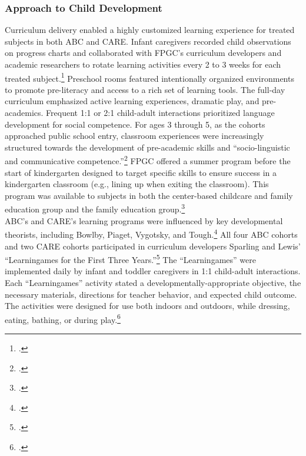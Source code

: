 \begin{appendices}
\subsubsection{Approach to Child Development}
\noindent Curriculum delivery enabled a highly customized learning experience for treated subjects in both ABC and CARE. Infant caregivers recorded child observations on progress charts and collaborated with FPGC's curriculum developers and academic researchers to rotate learning activities every 2 to 3 weeks for each treated subject.\footnote{\citet{Ramey_Collier_etal_1976_CarolinaAbecedarianProject,Campbell_Ramey_1994_CD}.} Preschool rooms featured intentionally organized environments to promote pre-literacy and access to a rich set of learning tools. The full-day curriculum emphasized active learning experiences, dramatic play, and pre-academics. Frequent 1:1 or 2:1 child-adult interactions prioritized language development for social competence. For ages 3 through 5, as the cohorts approached public school entry, classroom experiences were increasingly structured  towards the development of pre-academic skills and ``socio-linguistic and communicative competence.''\footnote{\citet{Ramey-et-al_1977_Intro-to-ABC, Haskins_1985_CD, Ramey_1981_Modification, Ramey_Campbell_1979_SR, Ramey_Smith_1977_AJMD, Ramey_McGinness_etal_1982_Abecedarianapproach, Sparling_Lewis_1979_BOOKLearninggamesFirstThree,Sparling_Lewis_1984_BOOKLearningGamesThreesFours}.} FPGC offered a summer program before the start of kindergarten designed to target specific skills to ensure success in a kindergarten classroom (e.g., lining up when exiting the classroom). This program was available to subjects in both the center-based childcare and family education group and the family education group.\footnote{\citet{Ramey_etal_1985_Project-CARE_TiECSE}.} \\

\noindent ABC's and CARE's learning programs were influenced by key developmental theorists, including Bowlby, Piaget, Vygotsky, and Tough.\footnote{\citet{Sparling_1974_Synth_Edu_Infant_SPEECH,Mcginness_1981_Developing,abc2014-2015interviews}.} All four ABC cohorts and two CARE cohorts participated in curriculum developers Sparling and Lewis' ``Learningames for the First Three Years.''\footnote{ \citet{Sparling_Lewis_1979_BOOKLearninggamesFirstThree}.} The ``Learningames'' were implemented daily by infant and toddler caregivers in 1:1 child-adult interactions. Each ``Learningames'' activity stated a developmentally-appropriate objective, the necessary materials, directions for teacher behavior, and expected child outcome. The activities were designed for use both indoors and outdoors, while dressing, eating, bathing, or during play.\footnote{\citet{Ramey_Campbell_1979_SR, Ramey_1981_Modification,Sparling_Lewis_1979_BOOKLearninggamesFirstThree}.}\\


\end{appendices}
